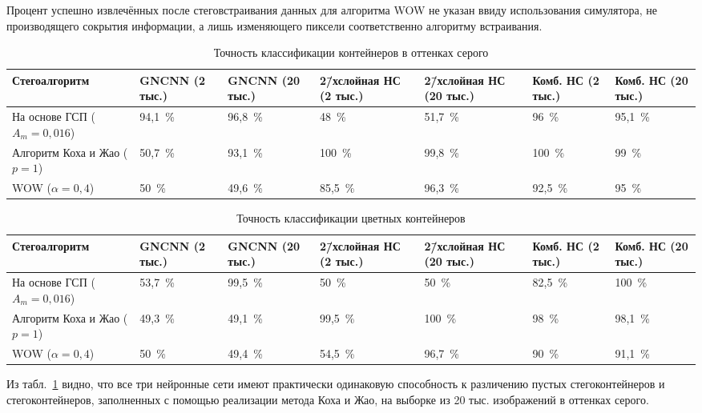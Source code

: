 Процент успешно извлечённых после стеговстраивания данных для алгоритма WOW не указан ввиду использования симулятора, не производящего сокрытия информации, а лишь изменяющего пиксели соответственно алгоритму встраивания.
\begin{landscape}

\begin{table}[h!]
\centering
    \begin{tabular}{| l | p{2cm} | p{2cm} | p{2cm} | p{2cm} | p{2cm} | p{2cm} |}
    \hline
    Стегоалгоритм & GNCNN (2 тыс.) & GNCNN (20 тыс.) & 2\=/хслойная НС (2 тыс.) & 2\=/хслойная НС (20 тыс.) & Комб. НС (2 тыс.) & Комб. НС (20 тыс.) \\ \hline
    На основе ГСП ($ A_m = 0,016 $) & 94,1~\% & 96,8~\% & 48~\% & 51,7~\% & 96~\% & 95,1~\% \\ \hline
    Алгоритм Коха и Жао ($ p = 1 $) & 50,7~\% & 93,1~\% & 100~\% & 99,8~\% & 100~\% & 99~\% \\ \hline
    WOW ($ \alpha = 0,4 $) & 50~\% & 49,6~\% & 85,5~\% & 96,3~\% & 92,5~\% & 95~\% \\ \hline
    \end{tabular}
\caption{Точность классификации контейнеров в оттенках серого}
\label{table:2}
\end{table}

\begin{table}[h!]
\centering
    \begin{tabular}{| l | p{2cm} | p{2cm} | p{2cm} | p{2cm} | p{2cm} | p{2cm} |}
    \hline
    Стегоалгоритм & GNCNN (2 тыс.) & GNCNN (20 тыс.) & 2\=/хслойная НС (2 тыс.) & 2\=/хслойная НС (20 тыс.) & Комб. НС (2 тыс.) & Комб. НС (20 тыс.) \\ \hline
    На основе ГСП ($ A_m = 0,016 $) & 53,7~\% & 99,5~\% & 50~\% & 50~\% & 82,5~\% & 100~\% \\ \hline
    Алгоритм Коха и Жао ($ p = 1 $) & 49,3~\% & 49,1~\% & 99,5~\% & 100~\% & 98~\% & 98,1~\% \\ \hline
    WOW ($ \alpha = 0,4 $) & 50~\% & 49,4~\% & 54,5~\% & 96,7~\% & 90~\% & 91,1~\% \\ \hline
    \end{tabular}
\caption{Точность классификации цветных контейнеров}
\label{table:2Color}
\end{table}
\end{landscape}

Из табл.~\ref{table:2} видно, что все три нейронные сети имеют практически одинаковую способность к различению пустых стегоконтейнеров и стегоконтейнеров, заполненных с помощью реализации метода Коха и Жао, на выборке из 20 тыс. изображений в оттенках серого.

